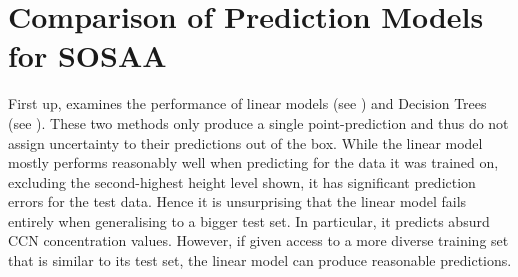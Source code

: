 \section{Comparison of Prediction Models for SOSAA} \label{txt:model-evaluation}

First up,  examines the performance of linear models (see ) and Decision Trees (see ). These two methods only produce a single point-prediction and thus do not assign uncertainty to their predictions out of the box. While the linear model mostly performs reasonably well when predicting for the data it was trained on, excluding the second-highest height level shown, it has significant prediction errors for the test data. Hence it is unsurprising that the linear model fails entirely when generalising to a bigger test set. In particular, it predicts absurd CCN concentration values. However, if given access to a more diverse training set that is similar to its test set, the linear model can produce reasonable predictions.

